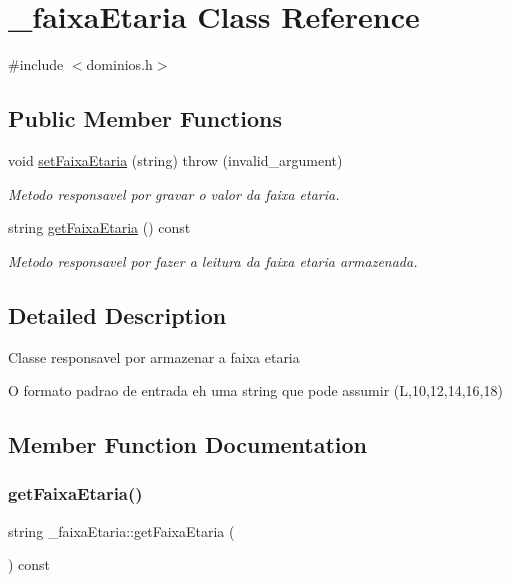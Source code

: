 \hypertarget{class__faixa_etaria}{}\section{\+\_\+faixa\+Etaria Class Reference}
\label{class__faixa_etaria}


{\ttfamily \#include $<$dominios.\+h$>$}

\subsection*{Public Member Functions}
\begin{DoxyCompactItemize}
\item 
void \mbox{\hyperlink{class__faixa_etaria_a78ad0280095c12e28b59dfc5b32536ed}{set\+Faixa\+Etaria}} (string)  throw (invalid\+\_\+argument)
\begin{DoxyCompactList}\small\item\em Metodo responsavel por gravar o valor da faixa etaria. \end{DoxyCompactList}\item 
string \mbox{\hyperlink{class__faixa_etaria_ab1d8e59698e2a00318dd790ee739ada6}{get\+Faixa\+Etaria}} () const
\begin{DoxyCompactList}\small\item\em Metodo responsavel por fazer a leitura da faixa etaria armazenada. \end{DoxyCompactList}\end{DoxyCompactItemize}


\subsection{Detailed Description}
Classe responsavel por armazenar a faixa etaria

O formato padrao de entrada eh uma string que pode assumir (L,10,12,14,16,18) 

\subsection{Member Function Documentation}
\mbox{\label{class__faixa_etaria_ab1d8e59698e2a00318dd790ee739ada6}} 
\subsubsection{\texorpdfstring{getFaixaEtaria()}{getFaixaEtaria()}}
{\footnotesize\ttfamily string \+\_\+faixa\+Etaria\+::get\+Faixa\+Etaria (\begin{DoxyParamCaption}{ }\end{DoxyParamCaption}) const\hspace{0.3cm}{\ttfamily [inline]}}



